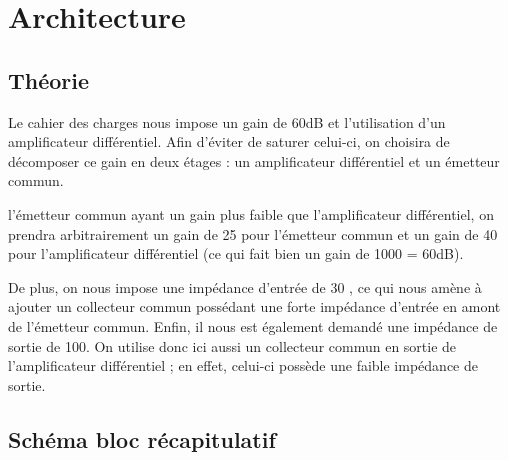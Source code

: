  \chapter{Architecture}
  \section{Théorie}

    Le cahier des charges nous impose un gain de 60dB et l'utilisation d'un amplificateur différentiel.
    Afin d'éviter de saturer celui-ci, on choisira de décomposer ce gain en deux étages : un amplificateur différentiel et un émetteur commun.

    l'émetteur commun ayant un gain plus faible que l'amplificateur différentiel, on prendra arbitrairement un gain de 25 pour l'émetteur commun et un gain de 40 pour l'amplificateur différentiel (ce qui fait bien un gain de 1000 = 60dB).

    De plus, on nous impose une impédance d'entrée de 30 \kilo\ohm, ce qui nous amène à ajouter un collecteur commun possédant une forte impédance d'entrée en amont de l'émetteur commun.
    Enfin, il nous est également demandé une impédance de sortie de 100\ohm. On utilise donc ici aussi un collecteur commun en sortie de l'amplificateur différentiel ; en effet, celui-ci possède une faible impédance de sortie.


  \section{Schéma bloc récapitulatif}

